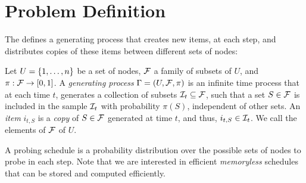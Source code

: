 \section{Problem Definition}\label{sec:prelims}
The {\probname} defines a generating process that creates new items, at each step, and distributes copies of these items between different sets of nodes:

\begin{definition}
Let $U=\set{1,\ldots,n}$ be a set of nodes, $\F$ a family of subsets of $U$, and $\pi:\F \rightarrow [0,1]$. 
A \emph{generating process} $\sys = (U, \F,\pi)$ is an infinite time process that at each time $t$, generates a collection of subsets $\S_t \subseteq\F$, such that a set $S\in \F$ is included in the sample $\S_t$  with probability $\pi(S)$, independent of other sets. 
An \emph{item} $i_{t,S}$ is a \emph{copy} of $S\in\F$ generated at time $t$, and thus, $i_{t,S}\in \S_t$.
We call the elements of $\F$ \emph{\ins} of $U$.
\end{definition}

A probing schedule is a probability distribution over the possible sets of nodes to probe in each step. Note that we are interested in efficient \emph{memoryless} schedules that can be stored and computed efficiently.

